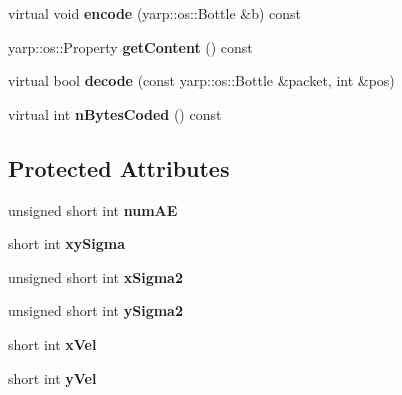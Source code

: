 \begin{DoxyCompactItemize}
\item 
\hypertarget{classemorph_1_1ClusterEventGauss_abef5e6b58b3e7ae3200fd623e9110d75}{virtual void {\bfseries encode} (yarp\-::os\-::\-Bottle \&b) const }\label{classemorph_1_1ClusterEventGauss_abef5e6b58b3e7ae3200fd623e9110d75}

\item 
\hypertarget{classemorph_1_1ClusterEventGauss_a2a6a74f6706217b8f75b9562e8f2f320}{yarp\-::os\-::\-Property {\bfseries get\-Content} () const }\label{classemorph_1_1ClusterEventGauss_a2a6a74f6706217b8f75b9562e8f2f320}

\item 
\hypertarget{classemorph_1_1ClusterEventGauss_a0a95ac26ca256bfbd0599b938ef82b5b}{virtual bool {\bfseries decode} (const yarp\-::os\-::\-Bottle \&packet, int \&pos)}\label{classemorph_1_1ClusterEventGauss_a0a95ac26ca256bfbd0599b938ef82b5b}

\item 
\hypertarget{classemorph_1_1ClusterEventGauss_a8cbd43b80dca05d8c6ba6c219fe1f98e}{virtual int {\bfseries n\-Bytes\-Coded} () const }\label{classemorph_1_1ClusterEventGauss_a8cbd43b80dca05d8c6ba6c219fe1f98e}

\end{DoxyCompactItemize}
\subsection*{Protected Attributes}
\begin{DoxyCompactItemize}
\item 
\hypertarget{classemorph_1_1ClusterEventGauss_af3aae4ebf9ad1480bfa69f31510de0ec}{unsigned short int {\bfseries num\-A\-E}}\label{classemorph_1_1ClusterEventGauss_af3aae4ebf9ad1480bfa69f31510de0ec}

\item 
\hypertarget{classemorph_1_1ClusterEventGauss_ab6729a1ffaa8830616a9aca3acbd7f17}{short int {\bfseries xy\-Sigma}}\label{classemorph_1_1ClusterEventGauss_ab6729a1ffaa8830616a9aca3acbd7f17}

\item 
\hypertarget{classemorph_1_1ClusterEventGauss_a6b982b8cfc34739bf96af09ac6374579}{unsigned short int {\bfseries x\-Sigma2}}\label{classemorph_1_1ClusterEventGauss_a6b982b8cfc34739bf96af09ac6374579}

\item 
\hypertarget{classemorph_1_1ClusterEventGauss_a5984b8f2d259c355100414d6240cc5bf}{unsigned short int {\bfseries y\-Sigma2}}\label{classemorph_1_1ClusterEventGauss_a5984b8f2d259c355100414d6240cc5bf}

\item 
\hypertarget{classemorph_1_1ClusterEventGauss_af77be89b7e9efdcc8be716f59b5eae62}{short int {\bfseries x\-Vel}}\label{classemorph_1_1ClusterEventGauss_af77be89b7e9efdcc8be716f59b5eae62}

\item 
\hypertarget{classemorph_1_1ClusterEventGauss_aade9776936f4d390084d4c34c26ef77f}{short int {\bfseries y\-Vel}}\label{classemorph_1_1ClusterEventGauss_aade9776936f4d390084d4c34c26ef77f}

\end{DoxyCompactItemize}
